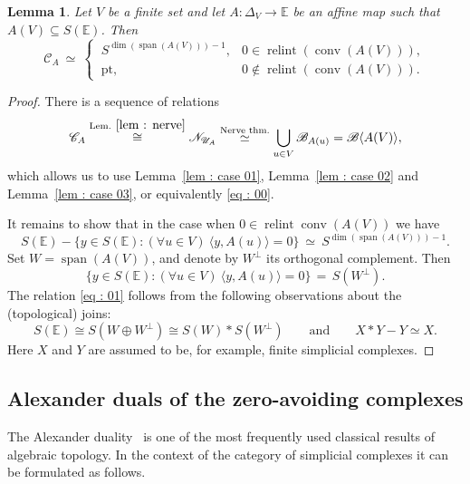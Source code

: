 \documentclass[a4paper,11pt,reqno, english]{amsart}
\newtheorem{lemma}[theorem]{Lemma}
\theoremstyle{definition}
\theoremstyle{remark}
\newcommand\NN{\mathscr N}
\newcommand\U{\mathscr U}
\newcommand\CC{\mathscr C}
\newcommand\E{\mathbb{E}}
\newcommand\pt{\mathrm{pt}}
\DeclareMathOperator{\spann}{\mathrm{span}}
\DeclareMathOperator{\relint}{\mathrm{relint}}
\DeclareMathOperator{\conv}{\mathrm{conv}}
\begin{document}
\medskip
\begin{lemma}
	\label{lem: topology of convexity complex}
	Let $V$ be a finite set and let $A\colon \Delta_V\longrightarrow\E$ be an affine map such that $A(V)\subseteq S(\E)$.
	Then
	\[
		\CC_A \ \simeq \
		\begin{cases}
			\  S^{\dim(\spann(A(V)))-1} , & 0\in \relint (\conv (A(V))),    \\
			\   \pt,                      & 0\notin  \relint(\conv (A(V))).
		\end{cases}
	\]
\end{lemma}
\begin{proof}
	There is a sequence of relations
	\[
		\CC_A\overset{\text{Lem. }\ref{lem : nerve}}{\cong}\NN_{\U_A}\overset{\text{Nerve thm.}}{\simeq}\bigcup_{u\in V}\mathscr{B}_{A(u)}=\mathscr{B}\langle A(V)\rangle ,
	\]
	which allows us to use Lemma~\ref{lem :  case 01}, Lemma~\ref{lem :  case 02} and Lemma~\ref{lem :  case 03}, or equivalently \eqref{eq : 00}.

	\medskip
	It remains to show that in the case when $ 0\in \relint\conv (A(V))$ we have
	\begin{equation}
		\label{eq : 01}
		S(\E)-\{y\in S(\E) : (\forall u\in V)\ \langle y,A(u)\rangle=0 \}\ \simeq \ S^{\dim (\spann(A(V)))-1}.
	\end{equation}
	Set $W=\spann(A(V))$, and denote by $W^{\perp}$ its orthogonal complement.
	Then
	\[\{y\in S(\E) : (\forall u\in V)\ \langle y,A(u)\rangle=0 \}\,=\,S(W^{\perp}).\]
	The relation \eqref{eq : 01} follows from the following observations about the (topological) joins:
	\[
		S(\E)\cong S(W\oplus W^{\perp})\cong S(W)*S(W^{\perp})
		\qquad\text{and}\qquad
		X*Y-Y\simeq X.
	\]
	Here $X$ and $Y$ are assumed to be, for example, finite simplicial complexes.
\end{proof}


\medskip
\subsection{Alexander duals of the zero-avoiding complexes}

The Alexander duality~\cite{Alexander1922} is one of the most frequently used classical results of algebraic topology.
In the context of the category of simplicial complexes it can be formulated as follows.
\end{document}
